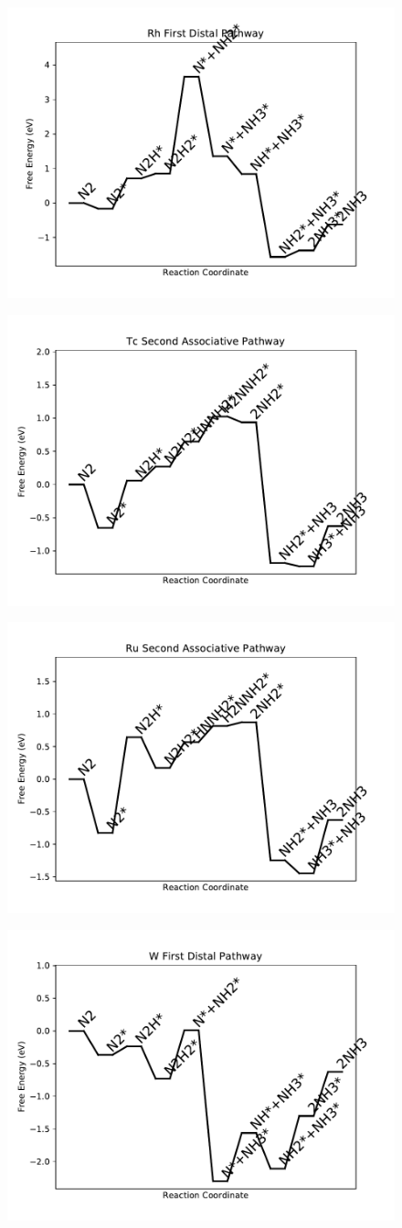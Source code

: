 \begin{figure}
\includegraphics[width=0.5\linewidth]{data/plots/Rh_distal_1.pdf}
\label{fig:Rh_distal_1}
\end{figure}

\begin{figure}
\includegraphics[width=0.5\linewidth]{data/plots/Tc_associative_2.pdf}
\label{fig:Tc_associative_2}
\end{figure}

\begin{figure}
\includegraphics[width=0.5\linewidth]{data/plots/Ru_associative_2.pdf}
\label{fig:Ru_associative_2}
\end{figure}

\begin{figure}
\includegraphics[width=0.5\linewidth]{data/plots/W_distal_1.pdf}
\label{fig:W_distal_1}
\end{figure}

